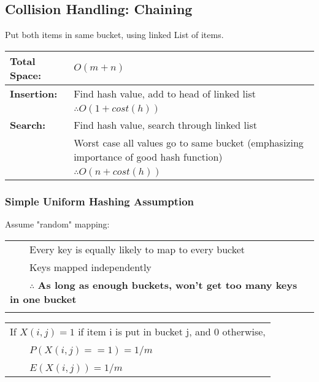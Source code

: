 \documentclass{article}
\newcommand{\tabitem}{~~\llap{\textbullet}~~}
\begin{document}
    \pagebreak

    \subsection{Collision Handling: Chaining}

    

    Put both items in same bucket, using linked List of items.
    \newline

    \begin{tabular}{ll}
        \toprule
        \textbf{Total Space:} & $O(m + n)$\\
        \midrule
        \textbf{Insertion:} & Find hash value, add to head of linked list\\
        &$\therefore O(1 + cost(h))$\\
        \midrule
        \textbf{Search:} & Find hash value, search through linked list\\
        &Worst case all values go to same bucket (emphasizing importance of good hash function)\\
        &$\therefore O(n + cost(h))$\\
        \bottomrule
    \end{tabular}

    \subsubsection{Simple Uniform Hashing Assumption}

    Assume "random" mapping:

    \begin{tabular}{l}
        \tabitem Every key is equally likely to map to every bucket\\
        \tabitem Keys mapped independently\\
        \tabitem $\therefore$ \textbf{As long as enough buckets, won't get too many keys in one bucket}\\\\
    \end{tabular}

    \begin{tabular}{l}
        If $X(i, j) = 1$ if item i is put in bucket j, and $0$ otherwise,\\
        \tabitem $P(X(i, j) == 1) = 1/m$\\
        \tabitem $E(X(i, j)) = 1/m$\\
    \end{tabular}
\end{document}
